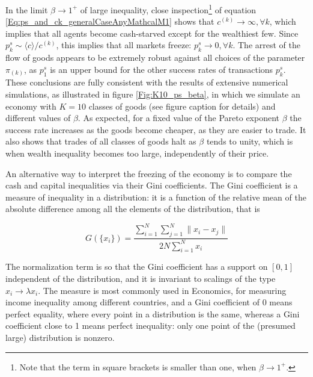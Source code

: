 In the limit  $\beta \to 1^+$ of large inequality, close inspection\footnote{Note that the term in square brackets is smaller than one, when $\beta \to 1^+$.} of equation \eqref{Eq:ps_and_ck_generalCaseAnyMathcalM1} shows that $ c^{(k)}  \to \infty, \forall k$, 
which implies that all agents become cash-starved except for the wealthiest few. Since $p^s_{k}\sim \langle c \rangle /c^{(k)}$, this implies that all markets freeze: $p^s_{k}\to 0 , \forall k$.  The arrest of the flow of goods appears to be  extremely robust against all choices of the parameter $\pi_{(k)}$, as $p^s_{1}$ is an upper bound for the other success rates of transactions $p^s_{k}$. These conclusions are fully consistent with the results of extensive numerical simulations, as illustrated in figure \ref{Fig:K10_ps_beta}, in which we simulate an economy with $K=10$ classes of goods (see figure caption for details) and different values of $\beta$. As expected, for a fixed value of the Pareto exponent $\beta$ the success rate increases as the goods become cheaper, as they are easier to trade.  It also shows that trades of all classes of goods halt as $\beta$ tends to unity, which is when wealth inequality becomes too large, independently of their price.


An alternative way to interpret the freezing of the economy is to compare the cash and capital inequalities via their Gini coefficients. The Gini coefficient is a measure of inequality in a distribution: it is a function of the relative mean of the absolute difference among all the elements of the distribution, that is

\begin{equation}
G(\{x_i\}) = \frac{\sum_{i=1}^N \sum_{j=1}^N \| x_i - x_j \|}{2 N \sum_{i=1}^N x_i}
\end{equation}

The normalization term is so that the Gini coefficient has a support on $[0, 1]$ independent of the distribution, and it is invariant to scalings of the type $x_i \to \lambda x_i$. The measure is most commonly used in Economics, for measuring income inequality among different countries, and a Gini coefficient of $0$ means perfect equality, where every point in a distribution is the same, whereas a Gini coefficient close to 1 means perfect inequality: only one point of the (presumed large) distribution is nonzero. 

